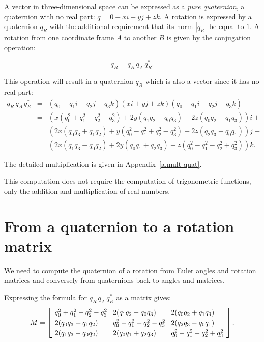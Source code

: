 \documentclass[11pt,a4paper]{report}
\newcommand*{\spacearray}{
\renewcommand{\arraystretch}{1.2}
\setlength{\arraycolsep}{4pt}
}
\begin{document}
A vector in three-dimensional space can be expressed as a \emph{pure quaternion}, a quaternion with no real part: $q = 0+xi+yj+zk$. A rotation is expressed by a quaternion $q_R$ with the additional requirement that its norm $|q_R|$ be equal to $1$. A rotation from one coordinate frame $A$ to another $B$ is given by the conjugation operation:

\begin{displaymath}
q_B = q_R \, q_A \,  q^*_R.
\end{displaymath}

This operation will result in a quaternion $q_B$ which is also a vector since it has no real part:
\begin{eqnarray*}
q_R \, q_A \,  q^*_R &=& (q_0+q_1i+q_2j+q_3k)(xi+yj+zk)(q_0-q_1i-q_2j-q_3k)\\
&=& (x(q_0^2+q_1^2-q_2^2-q_3^2)+2y(q_1q_2-q_0q_3)+2z(q_0q_2+q_1q_3))i +\\
&& (2x(q_0q_3+q_1q_2)+y(q_0^2-q_1^2+q_2^2-q_3^2)+2z(q_2q_3-q_0q_1))j +\\
&& (2x(q_1q_3-q_0q_2)+2y(q_0q_1+q_2q_3)+z(q_0^2-q_1^2-q_2^2+q_3^2))k.
\end{eqnarray*}

The detailed multiplication is given in Appendix~\ref{a.mult-quat}.

This computation does not require the computation of trigonometric functions, only the addition and multiplication of real numbers.


\section{From a quaternion to a rotation matrix}

We need to compute the quaternion of a rotation from Euler angles and rotation matrices and conversely from quaternions back to angles and matrices.

Expressing the formula for $q_R \, q_A \,  q^*_R$ as a matrix gives:
\begin{displaymath}
\spacearray
M=
\left[
\begin{array}{lll}
q_0^2+q_1^2-q_2^2-q_3^2 & 2(q_1q_2-q_0q_3) & 2(q_0q_2+q_1q_3)\\
2(q_0q_3+q_1q_2) & q_0^2-q_1^2+q_2^2-q_3^2 & 2(q_2q_3-q_0q_1)\\
2(q_1q_3-q_0q_2) & 2(q_0q_1+q_2q_3) & q_0^2-q_1^2-q_2^2+q_3^2\\
\end{array}
\right].
\end{displaymath}
\end{document}
